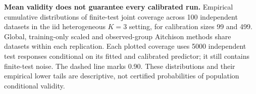 \textbf{Mean validity does not guarantee every calibrated run.} Empirical cumulative distributions of finite-test joint coverage across 100 independent datasets in the iid heterogeneous $K=3$ setting, for calibration sizes 99 and 499. Global, training-only scaled and observed-group Aitchison methods share datasets within each replication. Each plotted coverage uses 5000 independent test responses conditional on its fitted and calibrated predictor; it still contains finite-test noise. The dashed line marks 0.90. These distributions and their empirical lower tails are descriptive, not certified probabilities of population conditional validity.
